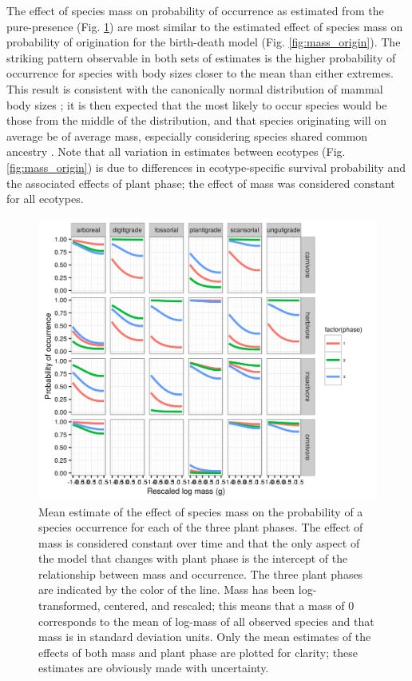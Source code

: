 \documentclass[12pt,letterpaper]{article}
\begin{document}
The effect of species mass on probability of occurrence as estimated from the pure-presence (Fig. \ref{fig:mass_occur}) are most similar to the estimated effect of species mass on probability of origination for the birth-death model (Fig. \ref{fig:mass_origin}). The striking pattern observable in both sets of estimates is the higher probability of occurrence for species with body sizes closer to the mean than either extremes. This result is consistent with the canonically normal distribution of mammal body sizes \citep{Smith2004}; it is then expected that the most likely to occur species would be those from the middle of the distribution, and that species originating will on average be of average mass, especially considering species shared common ancestry \citep{Felsenstein1985b}. Note that all variation in estimates between ecotypes (Fig. \ref{fig:mass_origin}) is due to differences in ecotype-specific survival probability and the associated effects of plant phase; the effect of mass was considered constant for all ecotypes.

\begin{figure}[ht]
  \centering
  \includegraphics[width=\textwidth,height=0.4\textheight,keepaspectratio=true]{figure/mass_on_pres}
  \caption[Effect of mass on probability of species occurrence as estimated from the pure-presence model]{Mean estimate of the effect of species mass on the probability of a species occurrence for each of the three plant phases. The effect of mass is considered constant over time and that the only aspect of the model that changes with plant phase is the intercept of the relationship between mass and occurrence. The three plant phases are indicated by the color of the line. Mass has been log-transformed, centered, and rescaled; this means that a mass of 0 corresponds to the mean of log-mass of all observed species and that mass is in standard deviation units. Only the mean estimates of the effects of both mass and plant phase are plotted for clarity; these estimates are obviously made with uncertainty.}
  \label{fig:mass_occur}
\end{figure}
\end{document}
